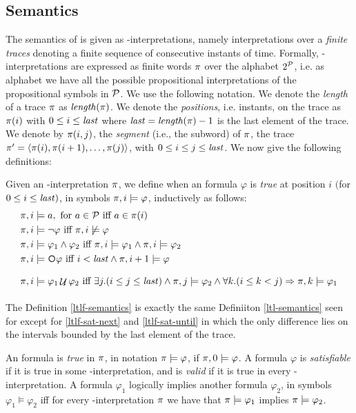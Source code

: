 \subsection{Semantics}
The semantics of \LTLf is given as \LT-interpretations, namely interpretations over a \emph{finite traces} denoting a finite sequence of consecutive instants of time. Formally, \LT-interpretations are expressed as finite words $\trace$ over the alphabet $2^\P$, i.e. as alphabet we have all the possible propositional interpretations of the propositional symbols in $\P$. We use the following notation. We denote the \emph{length} of a trace $\trace$ as $\length(\trace)$. We denote the \emph{positions}, i.e. instants, on the trace as $\trace(i)$ with $0 \le i \le \last$ where $\last = \length(\trace)-1$ is the last element of the trace. We denote by $\trace(i, j)$, the \emph{segment} (i.e., the subword) of $\trace$, the trace $\trace' = \tup{\trace(i), \trace(i+1), \dots, \trace(j)}$, with $0 \le i \le j \le \last$. We now give the following definitions:
\begin{definition}\label{ltlf-semantics}
Given an \LT-interpretation $\trace$, we define when an \LTLf formula $\varphi$ is \emph{true} at position $i$ $($for $0 \le i \le \last)$, in symbols $\trace, i \models \varphi$, inductively as follows:
\begin{align}
\trace, i &\models a, \tm{for} a\in\P \tiff a \in \trace(i)\nonumber\\
\trace, i &\models \lnot \varphi \tiff \trace, i \not\models \varphi\nonumber\\
\trace, i &\models \varphi_1 \lAND \varphi_2 \tiff \trace, i \models \varphi_1 \lAND \trace, i \models \varphi_2\nonumber\\
\trace, i &\models \Next\varphi \tiff i<\last \lAND \trace,i+1 \models \varphi \label{ltlf-sat-next}\\
\trace, i &\models \varphi_1 \lUntil \varphi_2 \tiff \exists j. (i\le j \le \last) \lAND \trace,j \models\varphi_2 \lAND  \forall k. (i\le k < j) \Rightarrow \trace, k \models \varphi_1 \label{ltlf-sat-until}
\end{align}
\end{definition}
The Definition \ref{ltlf-semantics} is exactly the same Definiiton \ref{ltl-semantics} seen for \LTL except for \ref{ltlf-sat-next} and \ref{ltlf-sat-until} in which the only difference lies on the intervals bounded by the last element of the trace.
\begin{definition}\label{ltlf-sat-val-ent}
An \LTLf formula is \emph{true} in $\trace$, in notation $\trace \models \varphi$, if $\trace, 0 \models \varphi$. A formula $\varphi$ is \emph{satisfiable} if it is true in some \LT-interpretation, and is \emph{valid} if it is true in every \LT-interpretation. A formula $\varphi_1$ logically implies another formula $\varphi_2$, in symbols $\varphi_1 \models \varphi_2$ iff for every \LT-interpretation $\trace$ we have that $\trace \models \varphi_1$ implies $ \trace \models \varphi_2$.
\end{definition}
